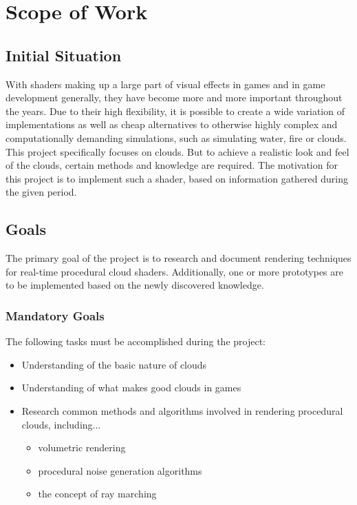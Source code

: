 \section{Scope of Work}

\subsection{Initial Situation}
With shaders making up a large part of visual effects in games and in game development generally, they have become more and more important throughout the years. Due to their high flexibility, it is possible to create a wide variation of implementations as well as cheap alternatives to otherwise highly complex and computationally demanding simulations, such as simulating water, fire or clouds.
\\ This project specifically focuses on clouds. But to achieve a realistic look and feel of the clouds, certain methods and knowledge are required. The motivation for this project is to implement such a shader, based on information gathered during the given period.


\subsection{Goals}
\label{section:goals}
The primary goal of the project is to research and document rendering techniques for real-time procedural cloud shaders. Additionally, one or more prototypes are to be implemented based on the newly discovered knowledge.

\subsubsection{Mandatory Goals}
The following tasks must be accomplished during the project:
\begin{itemize}
\item Understanding of the basic nature of clouds
\item Understanding of what makes good clouds in games
\item Research common methods and algorithms involved in rendering procedural clouds, including...
    \begin{itemize}
    \item volumetric rendering
    \item procedural noise generation algorithms
    \item the concept of ray marching
    \end{itemize}
\end{itemize}

